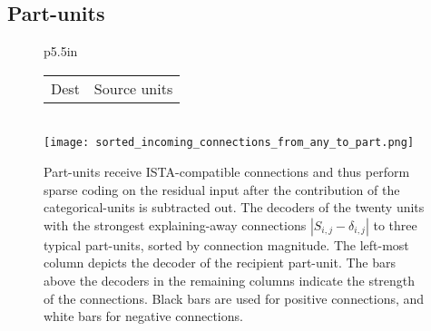 \documentclass{article} %
\begin{document}


\subsection{Part-units}

\begin{figure}[tb] %
  \begin{center}
    \begin{tabular}{p{5.5in}}
      \hspace{-0.1in} \begin{tabular}{p{0.175in}p{4in}} Dest & Source units \end{tabular} \\
      \texttt{[image: sorted\_incoming\_connections\_from\_any\_to\_part.png]} 
    \end{tabular}
  \end{center}
  \caption{Part-units receive ISTA-compatible connections and thus perform sparse coding on the residual input after the contribution of the categorical-units is subtracted out.  The decoders of the twenty units with the strongest explaining-away connections $\left|S_{i,j} - \delta_{i,j}\right|$ to three typical part-units, sorted by connection magnitude.  The left-most column depicts the decoder of the recipient part-unit.  The bars above the decoders in the remaining columns indicate the strength of the connections.  Black bars are used for positive connections, and white bars for negative connections.  \label{incoming_part_figure}}
\end{figure}
\end{document}
